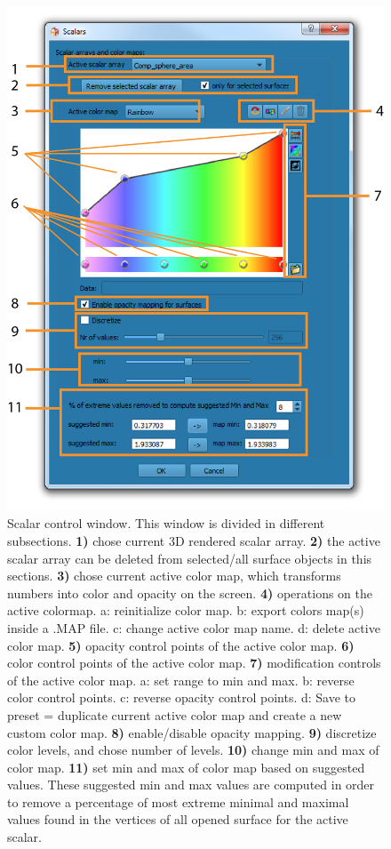 \begin{figure}
  \centering
  \includegraphics[scale=1]{images/11/scalar_rendering_option_window2.png}
\caption{Scalar control window. This window is divided in different subsections. \textbf{1)} chose current 3D rendered scalar array.  \textbf{2)} the active scalar array can be deleted from selected/all surface objects in this sections. \textbf{3)} chose current active color map, which transforms numbers into color and opacity on the screen. \textbf{4)} operations on the active colormap. a: reinitialize color map. b: export colors map(s) inside a .MAP file. c: change active color map name. d: delete active color map. \textbf{5)} opacity control points of the active color map. \textbf{6)} color control points of the active color map. \textbf{7)} modification controls of the active color map. a: set range to min and max. b: reverse color control points. c: reverse opacity control points. d: Save to preset = duplicate current active color map and create a new custom color map. \textbf{8)} enable/disable opacity mapping. \textbf{9)} discretize color levels, and chose number of levels. \textbf{10)} change min and max of color map. \textbf{11)} set min and max of color map based on suggested values. These suggested min and max values are computed in order to remove a percentage of most extreme minimal and maximal values found in the vertices of all opened surface for the active scalar.}	
\label{scalar_rendering_options_window}
 \end{figure}


